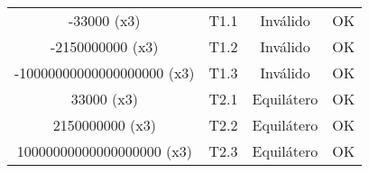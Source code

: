 \begin{table}[ht]
\begin{tabular}{|c|c|c|c|}
		-33000 (x3) & T1.1 & Inválido & \cellcolor{green!25} OK \\
		-2150000000 (x3) & T1.2 & Inválido & \cellcolor{green!25} OK \\
		-10000000000000000000 (x3) & T1.3 & Inválido &\cellcolor{green!25} OK  \\
		33000 (x3) & T2.1 & Equilátero & \cellcolor{green!25} OK \\
		2150000000 (x3) & T2.2 & Equilátero & \cellcolor{green!25} OK \\
		10000000000000000000 (x3) & T2.3 & Equilátero & \cellcolor{green!25} OK \\
		\hline
	\end{tabular}
\end{table}
